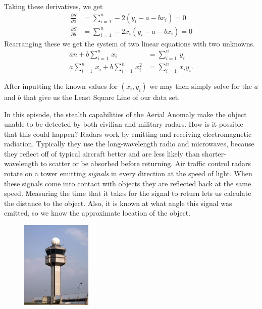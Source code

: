 Taking these derivatives, we get
	\[
	\begin{split}
	\frac{\partial S}{\partial a}&= \sum_{i=1}^n -2(y_i - a - bx_i) = 0 \\
	\frac{\partial S}{\partial b}&= \sum_{i=1}^n -2x_i (y_i  - a - bx_i)= 0
	\end{split}
	\]
Rearranging these we get the system of two linear equations with two unknowns. 
	\[
	\begin{split}
	an+b \sum_{i=1}^n \,x_i&= \sum_{i=1}^n \,y_i \\
	a \sum_{i=1}^n \,x_i + b \sum_{i=1}^n \,x_i^2&= \sum_{i=1}^n \,x_i y_i.
	\end{split}
	\]


After inputting the known values for $(x_i, y_i)$ we may then simply solve for the $a$ and $b$ that give us the Least Square Line of our data set.








In this episode, the stealth capabilities of the Aerial Anomaly make the object unable to be detected by both civilian and military radars. How is it possible that this could happen? Radars work by emitting and receiving electromagnetic radiation. Typically they use the long-wavelength radio and microwaves, because they reflect off of typical aircraft better and are less likely than shorter-wavelength to scatter or be absorbed before returning. Air traffic control radars rotate on a tower emitting \emph{signals} in every direction at the speed of light. When these signals come into contact with objects they are reflected back at the same speed. Measuring the time that it takes for the signal to return lets us calculate the distance to the object. Also, it is known at what angle this signal was emitted, so we know the approximate location of the object.


	\begin{figure}[H]
	\centering
	\includegraphics[width=0.3\textwidth]{../sections/seasons/season1/112/images/tower.jpg} 
	\end{figure}


